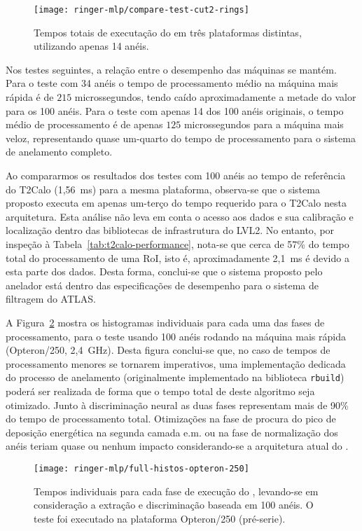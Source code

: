 \begin{figure}
\begin{center}
\texttt{[image: ringer-mlp/compare-test-cut2-rings]}
\end{center}
\caption{Tempos totais de executação do  em três plataformas
distintas, utilizando apenas 14 anéis.}
\label{fig:timings-histo-cut2}
\end{figure}

Nos testes seguintes, a relação entre o desempenho das máquinas se
mantém. Para o teste com 34 anéis o tempo de processamento médio na máquina
mais rápida é de $215$ microssegundos, tendo caído aproximadamente a metade do
valor para os 100 anéis. Para o teste com apenas 14 dos 100 anéis originais, o
tempo médio de processamento é de apenas $125$ microssegundos para a máquina
mais veloz, representando quase um-quarto do tempo de processamento para o
sistema de anelamento completo.

Ao compararmos os resultados dos testes com 100 anéis ao tempo de referência
do T2Calo (1,56~ms) para a mesma plataforma, observa-se que o sistema proposto
executa em apenas um-terço do tempo requerido para o T2Calo nesta
arquitetura. Esta análise não leva em conta o acesso aos dados e sua
calibração e localização dentro das bibliotecas de infrastrutura do LVL2. No
entanto, por inspeção à Tabela~\ref{tab:t2calo-performance}, nota-se que cerca
de 57\% do tempo total do processamento de uma RoI, isto é, aproximadamente
2,1~ms é devido a esta parte dos dados. Desta forma, conclui-se que o sistema
proposto pelo anelador está dentro das especificações de desempenho para o
sistema de filtragem do ATLAS.

A Figura~\ref{fig:p1-full-histos} mostra os histogramas individuais para cada
uma das fases de processamento, para o teste usando 100 anéis rodando na
máquina mais rápida (Opteron/250, 2,4~GHz). Desta figura conclui-se que, no
caso de tempos de processamento menores se tornarem imperativos, uma
implementação dedicada do processo de anelamento (originalmente implementado
na biblioteca \texttt{rbuild}) poderá ser realizada de forma que o tempo total
de deste algoritmo seja otimizado. Junto à discriminação neural as duas fases
representam mais de 90\% do tempo de processamento total. Otimizações na fase
de procura do pico de deposição energética na segunda camada e.m. ou na fase
de normalização dos anéis teriam quase ou nenhum impacto considerando-se a
arquitetura atual do .

\begin{figure}
\begin{center}
\texttt{[image: ringer-mlp/full-histos-opteron-250]}
\end{center}
\caption{Tempos individuais para cada fase de execução do ,
levando-se em consideração a extração e discriminação baseada em 100 anéis. O
teste foi executado na plataforma Opteron/250 (pré-serie).}
\label{fig:p1-full-histos}
\end{figure}

